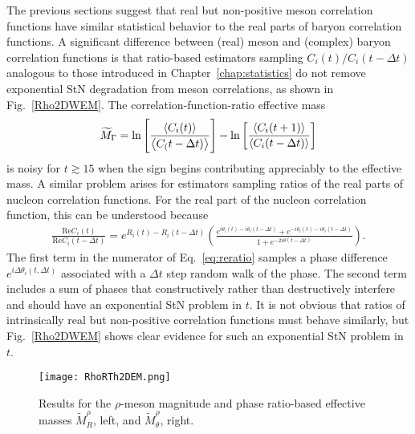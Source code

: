 The previous sections suggest that real but non-positive meson correlation functions have similar statistical behavior to the real parts of baryon correlation functions.
A significant difference between (real) meson and (complex) baryon correlation functions is that ratio-based estimators sampling $C_i(t)/C_i(t-\Delta t)$ analogous to those introduced in Chapter~\ref{chap:statistics} do not remove exponential StN degradation from meson correlations, as shown in
Fig.~\ref{Rho2DWEM}.
The correlation-function-ratio effective mass 
\begin{equation}
  \begin{split}
    \widetilde{M}_\Gamma = \ln\left[ \frac{\left< C_i(t) \right>}{\left< C_(t-\Delta t) \right>} \right] - \ln\left[ \frac{\left< C_i(t+1) \right>}{\left< C_i(t-\Delta t) \right>}\right]
  \end{split}\label{MGammadef}
\end{equation}
is noisy for $t\gtrsim 15$ when the sign begins contributing appreciably to the effective mass.
A similar problem arises for estimators sampling ratios of the real parts of nucleon correlation functions.
For the real part of the nucleon correlation function, this can be understood because
\begin{equation}
  \begin{split}
    \frac{\text{Re}C_i(t)}{\text{Re}C_i(t-\Delta t)} = e^{R_i(t) - R_i(t-\Delta t)}\left( \frac{e^{i\theta_i(t) - i\theta_i(t-\Delta t)} + e^{-i\theta_i(t) - i \theta_i(t-\Delta t)}}{1 + e^{-2i\theta(t-\Delta t)}} \right).
  \end{split}\label{eq:reratio}
\end{equation}
The first term in the numerator of Eq.~\eqref{eq:reratio} samples a phase difference $e^{i \Delta \theta_i(t, \Delta t)}$ associated with a $\Delta t$ step random walk of the phase.
The second term includes a sum of phases that
constructively rather than destructively interfere
and should have an exponential StN problem in $t$.
It is not obvious that ratios of intrinsically real but non-positive correlation functions must behave similarly,
but Fig.~\ref{Rho2DWEM} shows clear evidence for such an exponential StN problem in $t$.


\begin{figure}[!t]
  \centering
  \texttt{[image: RhoRTh2DEM.png]} 
  \caption{Results for the $\rho$-meson magnitude and phase ratio-based effective masses $\tilde{M}_R^\rho$, left, and $\tilde{M}_\theta^\rho$, right.}
  \label{Rho2DRThWEM}
\end{figure}

